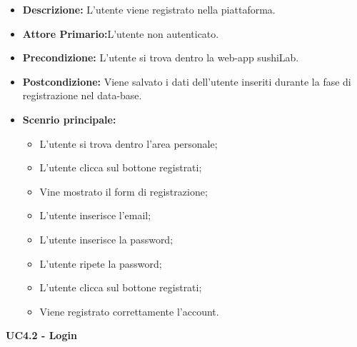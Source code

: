 \begin{itemize}
    \item \textbf{Descrizione:} L'utente viene registrato nella piattaforma.
    \item \textbf{Attore Primario:}L'utente non autenticato.
    \item \textbf{Precondizione:} L'utente si trova dentro la web-app sushiLab.
    \item \textbf{Postcondizione:} Viene salvato i dati dell'utente inseriti durante la fase di registrazione nel data-base.
    \item \textbf{Scenrio principale:}
    \begin{itemize}
        \item L'utente si trova dentro l'area personale;
        \item L'utente clicca sul bottone registrati;
        \item Vine mostrato il form di registrazione;
        \item L'utente inserisce l'email;
        \item L'utente inserisce la password;
        \item L'utente ripete la password;
        \item L'utente clicca sul bottone registrati;
        \item Viene registrato correttamente l'account.
    \end{itemize}
\end{itemize}
\textbf{UC4.2 - Login}
